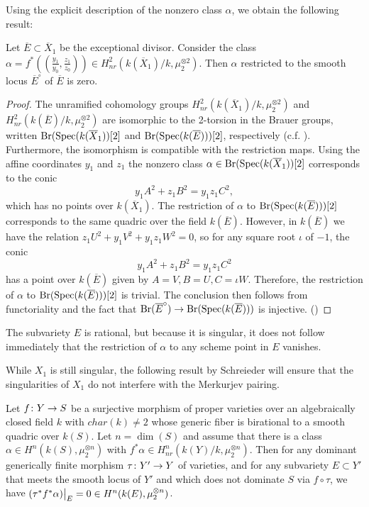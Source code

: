 Using the explicit description of the nonzero class $\alpha$, we obtain the following result:
\begin{lemma}
\label{lem:ERestriction}
  Let $\overline{E} \subset \overline{X}_1$ be the exceptional divisor. Consider the class $\alpha = f^*((\frac{y_1}{y_0},\frac{z_1}{z_0})) \in H_{nr}^2(k(\overline{X}_1)/k,\mu_2^{\otimes 2})$. Then $\alpha$ restricted to the smooth locus $\overline{E}^\circ$ of $\overline{E}$ is zero.
\end{lemma}
\begin{proof}
The unramified cohomology groups $H_{nr}^2(k(\overline{X}_1)/k,\mu_2^{\otimes 2})$ and $H_{nr}^2(k(\overline{E})/k,\mu_2^{\otimes 2})$ are isomorphic to the 2-torsion in the Brauer groups, written $\operatorname{Br}(\operatorname{Spec}(k(\overline{X}_1))[2]$ and $\operatorname{Br}(\operatorname{Spec}(k(\overline{E})))[2]$, respectively (c.f. \cite[Proposition 4.11]{SchreiederCyclesAndRationality}). Furthermore, the isomorphism is compatible with the restriction maps. Using the affine coordinates $y_1$ and $z_1$ the nonzero class $\alpha \in \operatorname{Br}(\operatorname{Spec}(k(\overline{X}_1))[2]$ corresponds to the conic
  \[y_1A^2 + z_1B^2 = y_1z_1C^2,\]
  which has no points over $k(\overline{X}_1)$. The restriction of $\alpha$ to $\operatorname{Br}(\operatorname{Spec}(k(\overline{E})))[2]$ corresponds to the same quadric over the field $k(\overline{E})$. However, in $k(\overline{E})$ we have the relation $z_1U^2 + y_1V^2 + y_1z_1W^2 = 0$, so for any square root $\iota$ of $-1$, the conic
  \[y_1A^2 + z_1B^2 = y_1z_1C^2\]
   has a point over $k(\overline{E})$ given by $A=V,B=U,C=\iota W$. Therefore, the restriction of $\alpha$ to $\operatorname{Br}(\operatorname{Spec}(k(\overline{E})))[2]$ is trivial. The conclusion then follows from functoriality and the fact that $\operatorname{Br}(\overline{E}^\circ) \to \operatorname{Br}(\operatorname{Spec}(k(\overline{E})))$ is injective. (\cite[Theorem 3.5.5]{CTS21})
\end{proof}

\begin{remark}
The subvariety $E$ is rational, but because it is singular, it does not follow immediately that the restriction of $\alpha$ to any scheme point in $E$ vanishes.
\end{remark}

While $X_1$ is still singular, the following result by Schreieder will ensure that the singularities of $X_1$ do not interfere with the Merkurjev pairing.
\begin{theorem}{{\cite[Theorem 10.1]{SchreiederCyclesAndRationality}}}	
  \label{thm:SchreiederVanishing}
  Let $f \colon Y \to S$ be a surjective morphism of proper varieties over an algebraically closed field $k$ with $char(k) \neq 2$ whose generic fiber is birational to a smooth quadric over $k(S)$. Let $n = \dim(S)$ and assume that there is a class $\alpha \in H^n(k(S),\mu_2^{\otimes n})$ with $f^* \alpha \in H_{nr}^n(k(Y)/k,\mu_2^{\otimes n})$.
  Then for any dominant generically finite morphism $\tau \colon Y' \to Y$ of varieties, and for any subvariety $E \subset Y'$ that meets the smooth locus of $Y'$ and which does not dominate $S$ via $f \circ \tau$, we have $\restr{(\tau^* f^* \alpha)}{E} = 0 \in H^n(k(E),\mu_2^{\otimes n})$.
\end{theorem}

